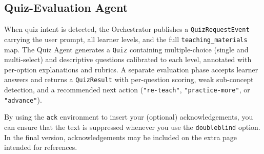 \documentclass{ecai}
\begin{document}
\subsection{Quiz-Evaluation Agent}

When quiz intent is detected, the Orchestrator publishes a
\texttt{QuizRequestEvent} carrying the user prompt, all learner levels,
and the full \texttt{teaching\_materials} map. The Quiz Agent generates a
\texttt{Quiz} containing multiple-choice (single and multi-select) and
descriptive questions calibrated to each level, annotated with per-option
explanations and rubrics. A separate evaluation phase accepts learner
answers and returns a \texttt{QuizResult} with per-question scoring,
weak sub-concept detection, and a recommended next action
(\texttt{"re-teach"}, \texttt{"practice-more"}, or \texttt{"advance"}).






\begin{ack}
By using the \texttt{ack} environment to insert your (optional) 
acknowledgements, you can ensure that the text is suppressed whenever 
you use the \texttt{doubleblind} option. In the final version, 
acknowledgements may be included on the extra page intended for references.
\end{ack}





\clearpage
\appendix

\end{document}
